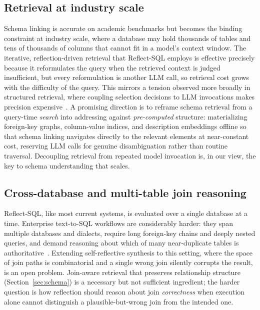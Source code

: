 \subsection{Retrieval at industry scale}
Schema linking is accurate on academic benchmarks but becomes the binding constraint at industry scale, where a database may hold thousands of tables and tens of thousands of columns that cannot fit in a model's context window. The iterative, reflection-driven retrieval that Reflect-SQL employs is effective precisely because it reformulates the query when the retrieved context is judged insufficient, but every reformulation is another LLM call, so retrieval cost grows with the difficulty of the query. This mirrors a tension observed more broadly in structured retrieval, where coupling selection decisions to LLM invocations makes precision expensive~\cite{ye2023dater,wang2024chaintable}. A promising direction is to reframe schema retrieval from a query-time \emph{search} into addressing against \emph{pre-computed} structure: materializing foreign-key graphs, column-value indices, and description embeddings offline so that schema linking navigates directly to the relevant elements at near-constant cost, reserving LLM calls for genuine disambiguation rather than routine traversal. Decoupling retrieval from repeated model invocation is, in our view, the key to schema understanding that scales.

\subsection{Cross-database and multi-table join reasoning}
Reflect-SQL, like most current systems, is evaluated over a single database at a time. Enterprise text-to-SQL workflows are considerably harder: they span multiple databases and dialects, require long foreign-key chains and deeply nested queries, and demand reasoning about which of many near-duplicate tables is authoritative~\cite{lei2024spider2}. Extending self-reflective synthesis to this setting, where the space of join paths is combinatorial and a single wrong join silently corrupts the result, is an open problem. Join-aware retrieval that preserves relationship structure (Section~\ref{sec:schema}) is a necessary but not sufficient ingredient; the harder question is how reflection should reason about join \emph{correctness} when execution alone cannot distinguish a plausible-but-wrong join from the intended one.

